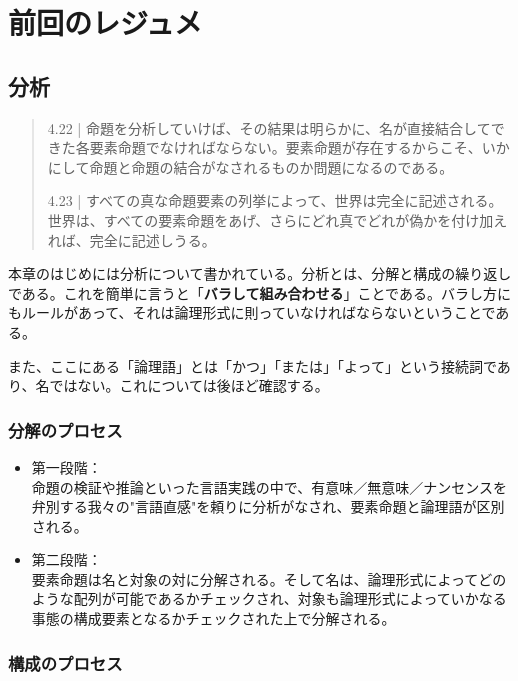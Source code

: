 \documentclass[a4paper,onecolumn,article]{jarticle}
\newcounter{ct}               %
\begin{document}
\section{前回のレジュメ}
{\small

\subsection{分析}

\begin{quote}

4.22 | 命題を分析していけば、その結果は明らかに、名が直接結合してできた各要素命題でなければならない。要素命題が存在するからこそ、いかにして命題と命題の結合がなされるものか問題になるのである。

4.23 | すべての真な命題要素の列挙によって、世界は完全に記述される。世界は、すべての要素命題をあげ、さらにどれ真でどれが偽かを付け加えれば、完全に記述しうる。


\end{quote}

本章のはじめには分析について書かれている。分析とは、分解と構成の繰り返しである。これを簡単に言うと「{\bf{バラして組み合わせる}}」ことである。バラし方にもルールがあって、それは論理形式に則っていなければならないということである。

また、ここにある「論理語」とは「かつ」「または」「よって」という接続詞であり、名ではない。これについては後ほど確認する。


\subsubsection{分解のプロセス}

\begin{itemize}

\item 第一段階：\\命題の検証や推論といった言語実践の中で、有意味／無意味／ナンセンスを弁別する我々の"言語直感"を頼りに分析がなされ、要素命題と論理語が区別される。

\item 第二段階：\\要素命題は名と対象の対に分解される。そして名は、論理形式によってどのような配列が可能であるかチェックされ、対象も論理形式によっていかなる事態の構成要素となるかチェックされた上で分解される。

\end{itemize}



\subsubsection{構成のプロセス}

}
\end{document}
